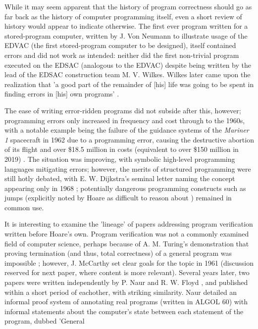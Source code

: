 \documentclass[11pt]{article}
\begin{document}
While it may seem apparent that the history of program correctness should go as
far back as the history of computer programming itself, even a short review of
history would appear to indicate otherwise. The first ever program written for
a stored-program computer, written by J. Von Neumann to illustrate usage of the
EDVAC (the first stored-program computer to be designed), itself contained
errors and did not work as intended: neither did the first non-trivial program
executed on the EDSAC (analogous to the  EDVAC) despite being written by the
lead of the EDSAC construction team M. V.  Wilkes.  Wilkes later came upon the
realization that 'a good part of the remainder of [his] life was going to be
spent in finding errors in [his] own programs' \cite{hayes1993discovery}. 
\par
The ease of writing error-ridden programs did not subside after this, however;
programming errors only increased in frequency and cost through to the 1960s,
with a notable example being the failure of the guidance systems of the
\textit{Mariner 1} spacecraft in 1962 due to a programming error, causing the
destructive abortion of its flight and over \$18.5 million in costs
(equivalent to over \$150 million in 2019) \cite{nytimesmariner}. The situation
was improving, with symbolic high-level programming languages mitigating errors;
however, the merits of structured programming were still hotly debated, with E.
W. Dijkstra's seminal letter naming the concept appearing only in 1968
\cite{dijkstra1968letters}; potentially dangerous programming constructs such as
jumps (explicitly noted by Hoare as difficult to reason about
\cite{hoare1969axiomatic}) remained in common use. 
\par 
It is interesting to examine the 'lineage' of papers addressing program
verification written before Hoare's own. Program verification was not a commonly
examined field of computer science, perhaps because of A. M. Turing's
demonstration that proving termination (and thus, total correctness) of a
general program was impossible \cite{turing1937computable}; however, J. McCarthy
set clear goals for the topic in 1961 (discussion reserved for next paper, where
content is more relevant). Several years later, two papers were written
independently by P. Naur \cite{naur1966proof} and R. W. Floyd
\cite{floyd1967assigning}, and published within a short period of eachother,
with striking similarity. Naur detailed an informal proof system of annotating
real programs (written in ALGOL 60) with informal statements about the
computer's state between each statement of the program, dubbed 'General
\end{document}
